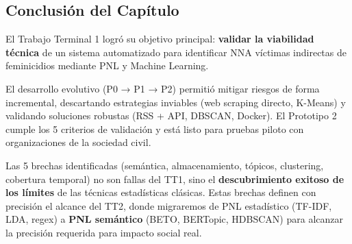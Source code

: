 \subsection{Conclusión del Capítulo}

El Trabajo Terminal 1 logró su objetivo principal: \textbf{validar la viabilidad técnica} de un sistema automatizado para identificar NNA víctimas indirectas de feminicidios mediante PNL y Machine Learning.

El desarrollo evolutivo (P0 → P1 → P2) permitió mitigar riesgos de forma incremental, descartando estrategias inviables (web scraping directo, K-Means) y validando soluciones robustas (RSS + API, DBSCAN, Docker). El Prototipo 2 cumple los 5 criterios de validación y está listo para pruebas piloto con organizaciones de la sociedad civil.

Las 5 brechas identificadas (semántica, almacenamiento, tópicos, clustering, cobertura temporal) no son fallas del TT1, sino el \textbf{descubrimiento exitoso de los límites} de las técnicas estadísticas clásicas. Estas brechas definen con precisión el alcance del TT2, donde migraremos de PNL estadístico (TF-IDF, LDA, regex) a \textbf{PNL semántico} (BETO, BERTopic, HDBSCAN) para alcanzar la precisión requerida para impacto social real.